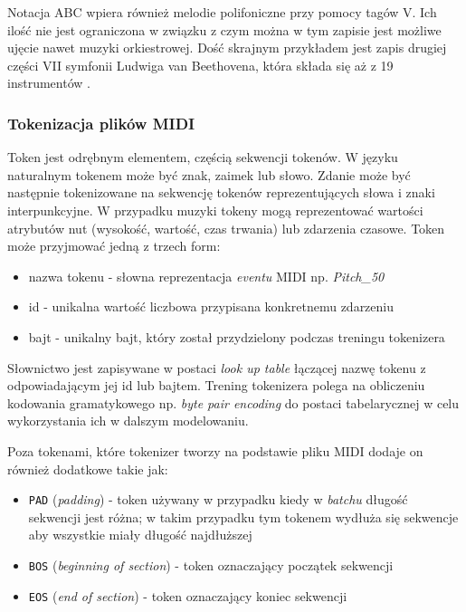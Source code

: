 \documentclass[data-science]{agh-wi} %
\begin{document}
Notacja ABC wpiera również melodie polifoniczne przy pomocy tagów V. Ich ilość nie jest ograniczona w związku z czym można w tym zapisie jest możliwe ujęcie nawet muzyki orkiestrowej. Dość skrajnym przykładem jest zapis drugiej części VII symfonii Ludwiga van Beethovena, która składa się aż z 19 instrumentów \cite{beethoven}.

\subsubsection{Tokenizacja plików MIDI}\label{sec:REMI}
Token jest odrębnym elementem, częścią sekwencji tokenów. W języku naturalnym tokenem może być znak, zaimek lub słowo. Zdanie może być następnie tokenizowane na sekwencję tokenów reprezentujących słowa i znaki interpunkcyjne. W przypadku muzyki tokeny mogą reprezentować wartości atrybutów nut (wysokość, wartość, czas trwania) lub zdarzenia czasowe. Token może przyjmować jedną z trzech form:
\begin{itemize}
    \item nazwa tokenu - słowna reprezentacja \textit{eventu} MIDI np. \textit{Pitch\_50}
    \item id - unikalna wartość liczbowa przypisana konkretnemu zdarzeniu
    \item bajt - unikalny bajt, który został przydzielony podczas treningu tokenizera
\end{itemize}

Słownictwo jest zapisywane w postaci \textit{look up table} łączącej nazwę tokenu z odpowiadającym jej id lub bajtem. Trening tokenizera polega na obliczeniu kodowania gramatykowego np. \textit{byte pair encoding} do postaci tabelarycznej w celu wykorzystania ich w dalszym modelowaniu.

Poza tokenami, które tokenizer tworzy na podstawie pliku MIDI dodaje on również dodatkowe takie jak:
\begin{itemize}
    \item \texttt{PAD} (\textit{padding}) - token używany w przypadku kiedy w \textit{batchu} długość sekwencji jest różna; w takim przypadku tym tokenem wydłuża się sekwencje aby wszystkie miały długość najdłuższej
    \item \texttt{BOS} (\textit{beginning of section}) - token oznaczający początek sekwencji
    \item \texttt{EOS} (\textit{end of section}) - token oznaczający koniec sekwencji
\end{itemize}
\end{document}
